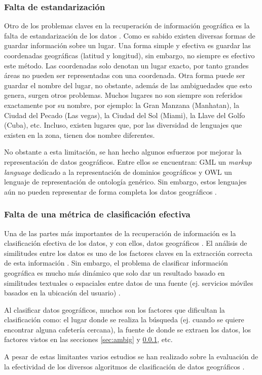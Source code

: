 \subsubsection{Falta de estandarización}\label{sec:estand}

Otro de los problemas claves en la recuperación de información geográfica es la
falta de estandarización de los datos \cite{deAndrade2014}. Como es sabido
existen diversas formas de guardar información sobre un lugar. Una forma simple
y efectiva es guardar las coordenadas geográficas (latitud y longitud), sin
embargo, no siempre es efectivo este método. Las coordenadas solo denotan un
lugar exacto, por tanto grandes áreas no pueden ser representadas con una
coordenada. Otra forma puede ser guardar el nombre del lugar, no obstante,
además de las ambiguedades que esto genera, surgen otros problemas. Muchos
lugares no son siempre son referidos exactamente por su nombre, por ejemplo: la
Gran Manzana (Manhatan), la Ciudad del Pecado (Las vegas), la Ciudad del Sol
(Miami), la Llave del Golfo (Cuba), etc. Incluso, existen lugares que, por las
diversidad de lenguajes que existen en la zona, tienen dos nombre diferentes.

No obstante a esta limitación, se han hecho algunos esfuerzos por mejorar la
representación de datos geográficos. Entre ellos se encuentran: GML un
\emph{markup language} dedicado a la representación de dominios geográficos y
OWL un lenguaje de representación de ontología genérico. Sin embargo, estos
lenguajes aún no pueden representar de forma completa los datos geográficos
\cite{abdelmoty2005}.

\subsubsection{Falta de una métrica de clasificación efectiva}\label{sec:metric}

Una de las partes más importantes de la recuperación de información es la
clasificación efectiva de los datos, y con ellos, datos geográficos
\cite{purves2004,mandl2008,cai2011}. El análisis de similitudes entre los datos
es uno de los factores claves en la extracción correcta de esta información
\cite{janowicz2011}. Sin embargo, el problema de clasificar información
geográfica es mucho más dinámico que solo dar un resultado basado en
similitudes textuales o espaciales entre datos de una fuente (ej. servicios
móviles basados en la ubicación del usuario) \cite{kumar2011}.

Al clasificar datos geográficos, muchos son los factores que dificultan la
clasificación como: el lugar donde se realiza la búsqueda (ej. cuando se quiere
encontrar alguna cafetería cercana), la fuente de donde se extraen los datos,
los factores vistos en las secciones \ref{sec:ambig} y \ref{sec:estand}, etc.

A pesar de estas limitantes varios estudios se han realizado sobre la evaluación
de la efectividad de los diversos algoritmos de clasificación de datos geográficos
 \cite{larson2004jul, larson2004sep}.

 \newpage

